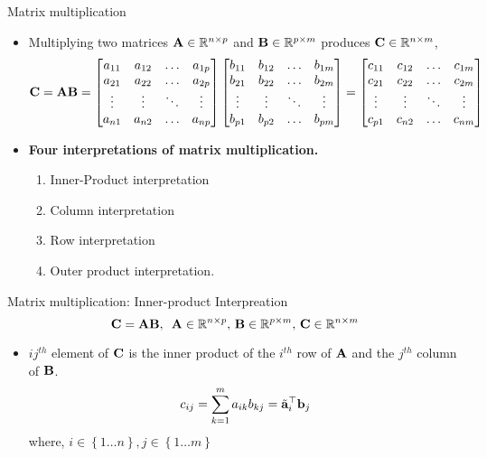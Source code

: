 \documentclass[aspectratio=169]{beamer}
\let\olditem\item
\renewcommand{\item}{\setlength{\itemsep}{\fill}\olditem}
\def\mf{\ensuremath\mathbf}
\begin{document}
\begin{frame}[t]{Matrix multiplication}
\begin{itemize}
\item Multiplying two matrices $\mf{A} \in \mathbb{R}^{n \times p}$ and $\mf{B} \in \mathbb{R}^{p \times m}$ produces $\mf{C} \in \mathbb{R}^{n \times m}$,
\[ \mf{C} = \mf{A}\mf{B} = \begin{bmatrix}
a_{11} & a_{12} & \ldots & a_{1p} \\
a_{21} & a_{22} & \ldots & a_{2p} \\
\vdots & \vdots & \ddots & \vdots \\
a_{n1} & a_{n2} & \ldots & a_{np} \\
\end{bmatrix} \begin{bmatrix}
b_{11} & b_{12} & \ldots & b_{1m} \\
b_{21} & b_{22} & \ldots & b_{2m} \\
\vdots & \vdots & \ddots & \vdots \\
b_{p1} & b_{p2} & \ldots & b_{pm} \\
\end{bmatrix} = \begin{bmatrix}
c_{11} & c_{12} & \ldots & c_{1m} \\
c_{21} & c_{22} & \ldots & c_{2m} \\
\vdots & \vdots & \ddots & \vdots \\
c_{p1} & c_{n2} & \ldots & c_{nm} \\
\end{bmatrix}\]

\item \textbf{Four interpretations of matrix multiplication.}
\begin{enumerate}
  \item Inner-Product interpretation
  \item Column interpretation
  \item Row interpretation
  \item Outer product interpretation.
\end{enumerate} 
\end{itemize}
\end{frame}

\begin{frame}[t]{Matrix multiplication: Inner-product Interpreation}
\[ \mf{C} = \mf{A}\mf{B}, \,\,\, \mf{A} \in \mathbb{R}^{n \times p}, \, \mf{B} \in \mathbb{R}^{p \times m}, \, \mf{C} \in \mathbb{R}^{n \times m} \]
\begin{itemize}
\item $ij^{th}$ element of $\mf{C}$ is the inner product of the $i^{th}$ row of $\mf{A}$ and the $j^{th}$ column of $\mf{B}$.
 \[ c_{ij} = \sum_{k=1}^{m} a_{ik} b_{kj} = \tilde{\mf{a}}_i^{\top}\mf{b}_j \]
 where, $i \in \left\{1 \ldots n\right\}, j \in \left\{1 \ldots m\right\}$
\end{itemize}
\end{frame}
\end{document}
